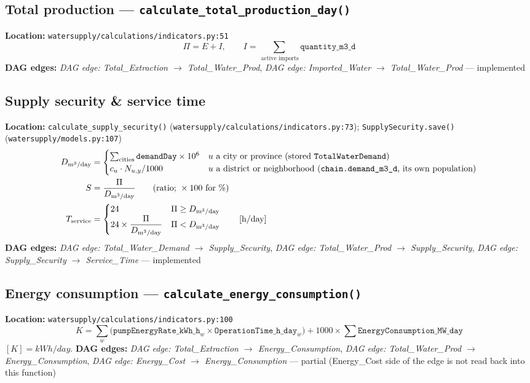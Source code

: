 \documentclass[11pt]{article}
\newcommand{\code}[1]{\texttt{#1}}
\newcommand{\dagedge}[1]{\textit{DAG edge: #1}}
\newcommand{\statusdone}{\textcolor{green!50!black}{implemented}}
\newcommand{\statuspartial}{\textcolor{orange!80!black}{partial}}
\begin{document}
\subsection{Total production --- \code{calculate\_total\_production\_day()}}
\textbf{Location:} \code{watersupply/calculations/indicators.py:51}
\begin{equation}
  \Pi = E + I, \qquad I = \sum_{\,\text{active imports}} \texttt{quantity\_m3\_d}
\end{equation}
\textbf{DAG edges:} \dagedge{Total\_Extraction $\rightarrow$ Total\_Water\_Prod}, \dagedge{Imported\_Water $\rightarrow$ Total\_Water\_Prod} --- \statusdone{}

\subsection{Supply security \& service time}
\label{sec:supplysecurity}
\textbf{Location:} \code{calculate\_supply\_security()} (\code{watersupply/calculations/indicators.py:73}); \code{SupplySecurity.save()} (\code{watersupply/models.py:107})
\begin{align}
  D_{\si{m^3/day}} &= \begin{cases}
    \sum_{\text{cities}} \texttt{demandDay} \times 10^6 & u \text{ a city or province (stored \code{TotalWaterDemand})} \\
    c_u \cdot N_{u,y} / 1000 & u \text{ a district or neighborhood (\code{chain.demand\_m3\_d}, its own population)}
  \end{cases} \\
  S &= \frac{\Pi}{D_{\si{m^3/day}}} \qquad \text{(ratio; } \times 100 \text{ for \%)}\\
  T_{\text{service}} &=
  \begin{cases}
    24 & \Pi \geq D_{\si{m^3/day}} \\
    24 \times \dfrac{\Pi}{D_{\si{m^3/day}}} & \Pi < D_{\si{m^3/day}}
  \end{cases}
  \qquad [\si{h/day}]
\end{align}
\textbf{DAG edges:} \dagedge{Total\_Water\_Demand $\rightarrow$ Supply\_Security}, \dagedge{Total\_Water\_Prod $\rightarrow$ Supply\_Security}, \dagedge{Supply\_Security $\rightarrow$ Service\_Time} --- \statusdone{}

\subsection{Energy consumption --- \code{calculate\_energy\_consumption()}}
\textbf{Location:} \code{watersupply/calculations/indicators.py:100}
\begin{equation}
  K = \sum_{w} \big(\texttt{pumpEnergyRate\_kWh\_h}_w \times \texttt{OperationTime\_h\_day}_w\big) + 1000 \times \sum \texttt{EnergyConsumption\_MW\_day}
\end{equation}
$[K] = \si{kWh/day}$. \textbf{DAG edges:} \dagedge{Total\_Extraction $\rightarrow$ Energy\_Consumption}, \dagedge{Total\_Water\_Prod $\rightarrow$ Energy\_Consumption}, \dagedge{Energy\_Cost $\rightarrow$ Energy\_Consumption} --- \statuspartial{} (Energy\_Cost side of the edge is not read back into this function)
\end{document}
